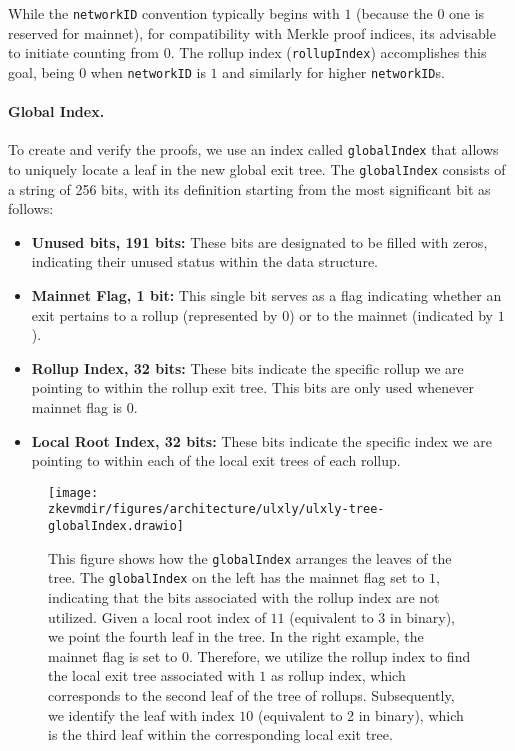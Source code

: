 While the \texttt{networkID} convention typically begins with $1$ (because the $0$ one is reserved for mainnet), for compatibility with Merkle proof indices, its advisable to initiate counting from $0$. The rollup index (\texttt{rollupIndex}) accomplishes this goal, being $0$ when \texttt{networkID} is $1$ and similarly for higher \texttt{networkID}s.


\paragraph*{Global Index.} To create and verify the proofs, we use an index called \texttt{globalIndex} that allows to uniquely locate a leaf in the new global exit tree. The \texttt{globalIndex} consists of a string of 256 bits, with its definition starting from the most significant bit as follows:

\begin{itemize}

\item \textbf{Unused bits, 191 bits:} These bits are designated to be filled with zeros, indicating their unused status within the data structure.

\item \textbf{Mainnet Flag, 1 bit:} This single bit serves as a flag indicating whether an exit pertains to a rollup (represented by $0$) or to the mainnet (indicated by $1$).

\item \textbf{Rollup Index, 32 bits:} These bits indicate the specific rollup we are pointing to within the rollup exit tree. This bits are only used whenever mainnet flag is $0$.

\item \textbf{Local Root Index, 32 bits:} These bits indicate the specific index we are pointing to within each of the local exit trees of each rollup.

\end{itemize}

\begin{figure}[h]
\centering
\texttt{[image: \\zkevmdir/figures/architecture/ulxly/ulxly-tree-globalIndex.drawio]}
\caption{This figure shows how the \texttt{globalIndex} arranges the leaves of the tree. The \texttt{globalIndex} on the left has the mainnet flag set to $1$, indicating that the bits associated with the rollup index are not utilized. Given a local root index of $11$ (equivalent to 3 in binary), we point the fourth leaf in the tree. In the right example, the mainnet flag is set to $0$. Therefore, we utilize the rollup index to find the local exit tree associated with $1$ as rollup index, which corresponds to the second leaf of the tree of rollups. Subsequently, we identify the leaf with index $10$ (equivalent to 2 in binary), which is the third leaf within the corresponding local exit tree. }
\label{fig:global-index}
\end{figure}










